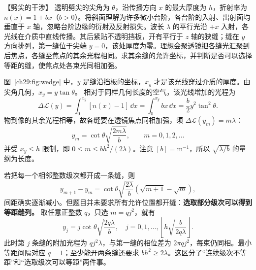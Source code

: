 \begin{origexamplebox}{【劈尖的干涉】}\label{ch29:ex:s44-21-4}
透明劈尖的尖角为 $\theta$，沿传播方向 $x$ 的最大厚度为 $h$，折射率为 $n(x)=1+bx$（$b>0$）。将斜面理解为许多微小台阶，各台阶的入射、出射面均垂直于 $x$ 轴，忽略台阶边缘的衍射及反射损失。波长 $\lambda$ 的平行光沿 $+x$ 入射，各光线在介质中直线传播。其后紧贴不透明挡板，开有平行于 $z$ 轴的狭缝；缝在 $y$ 方向排列，第一缝位于尖端 $y=0$，该处厚度为零。理想会聚透镜把各缝光汇聚到后焦点，各缝至焦点的其余光程相同。求其余缝的允许坐标，并判断是否可以选择等距的缝，使焦点处各束光同相加强。

\begin{center}\begin{minipage}{.96\linewidth}\centering
{}
\end{minipage}\end{center}
\end{origexamplebox}\par\nopagebreak[3]
\begin{xesolution}
图~\ref{ch29:fig:wedge} 中，$y$ 是缝沿挡板的坐标，$x_y$ 才是该光线穿过介质的厚度。由尖角几何，$x_y=y\tan\theta$。
\WedgeInterferenceDiagram
相对于同样几何长度的空气，该光线增加的光程为
\[
 \Delta\mathcal L(y)=\int_0^{x_y}[n(x)-1]\,\dd x
 =\int_0^{x_y}bx\,\dd x=\frac b2y^2\tan^2\theta.
\]
物到像的其余光程相等，故各缝要在透镜焦点同相加强，须 $\Delta\mathcal L(y_m)=m\lambda$：
\[
 \boxed{y_m=\cot\theta\sqrt{\frac{2m\lambda}{b}},\qquad m=0,1,2,\ldots}
\]
并受 $x_y\le h$ 限制，即 $0\le m\le bh^2/(2\lambda)$。注意 $[b]=\mathrm m^{-1}$，所以 $\sqrt{\lambda/b}$ 的量纲为长度。

若把每一个相邻整数级次都开成一条缝，则
\[
 y_{m+1}-y_m=\cot\theta\sqrt{\frac{2\lambda}{b}}
 (\sqrt{m+1}-\sqrt m),
\]
间距确实逐渐减小。但题目并未要求所有允许位置都开缝：\textbf{选取部分级次可以得到等距缝列。}
取任意正整数 $q$，只选 $m=qj^2$，就有
\[
 \boxed{y_j=j\cot\theta\sqrt{\frac{2q\lambda}{b}},\quad
 j=0,1,\ldots,\left\lfloor h\sqrt{\frac{b}{2q\lambda}}\right\rfloor.}
\]
此时第 $j$ 条缝的附加光程为 $qj^2\lambda$，与第一缝的相位差为 $2\pi qj^2$，每束仍同相。最小等距间隔对应 $q=1$；至少能开两条缝还要求 $bh^2\ge2\lambda$。这区分了“连续级次不等距”和“选取级次可以等距”两件事。
\end{xesolution}

